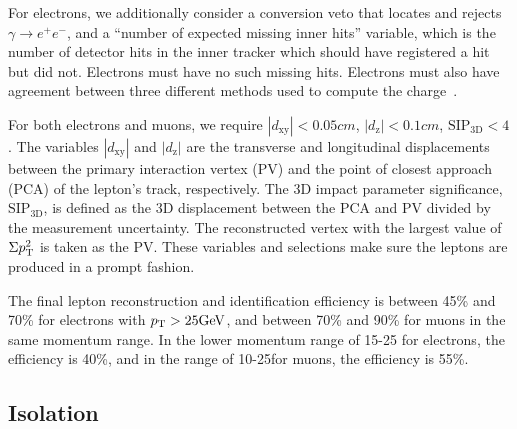 For electrons, we additionally consider a conversion veto that locates and rejects $\gamma \rightarrow e^{+} e^{-}$,
and a ``number of expected missing inner hits'' variable, which is the number of 
detector hits in the inner tracker which should have registered a hit but did not.
Electrons must have no such missing hits.
Electrons must also have agreement between three different methods used to compute the charge~\cite{CMS:AN14164}.

For both electrons and muons, we require $|d_\mathrm{xy}| < 0.05\unit{cm}$,
$|d_\mathrm{z}| < 0.1\unit{cm}$,
$\mathrm{SIP}_\mathrm{3D} < 4$. The variables $|d_\mathrm{xy}|$ and $|d_\mathrm{z}|$ are the transverse and longitudinal
displacements between the primary interaction vertex (PV) and the point of closest approach (PCA) of the lepton's 
track, respectively. The 3D impact parameter significance, $\mathrm{SIP}_\mathrm{3D}$,
is defined as the 3D displacement between the PCA and PV divided by the measurement uncertainty.
The reconstructed vertex with the largest value of $\Sigma p_{\mathrm{T}}^2$ is taken as
the PV. These variables and selections make sure the leptons are produced in a prompt fashion.

The final lepton reconstruction and identification efficiency is between
45\% and 70\% for electrons with $p_{\mathrm{T}} > 25\text{GeV}$, and between 70\% and 90\%
for muons in the same momentum range. In the lower momentum range of 15-25\GeV
for electrons, the efficiency is 40\%, and in the range of 10-25\GeV for muons,
the efficiency is 55\%. 

\subsection{Isolation}


